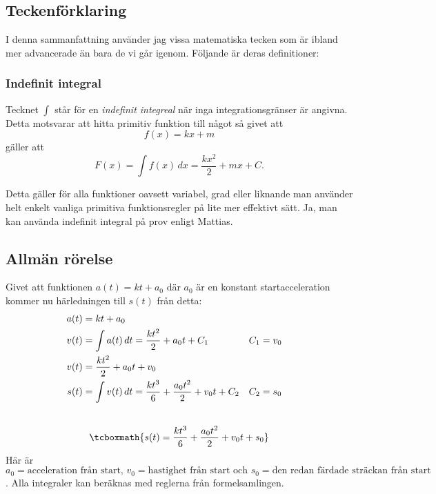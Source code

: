 \subsection{Teckenförklaring}
I denna sammanfattning använder jag vissa matematiska tecken som är ibland mer advancerade än bara de vi går igenom. Följande är deras definitioner:

\subsubsection*{Indefinit integral}
\label{def:indefint}
Tecknet $\int$ står för en \emph{indefinit integreal} när inga integrationsgränser är angivna. Detta motsvarar att hitta primitiv funktion till något så givet att \[f(x) = kx + m\] gäller att
\begin{equation*}
    F(x) = \int{f(x)}\, dx = \frac{kx^2}{2} + mx + C.
\end{equation*}

Detta gäller för alla funktioner oavsett variabel, grad eller liknande man använder helt enkelt vanliga primitiva funktionsregler på lite mer effektivt sätt. Ja, man kan använda indefinit integral på prov enligt Mattias.

\subsection{Allmän rörelse}
\label{derive:allmänrörelse}
Givet att funktionen $a(t) = kt + a_0$ där $a_0$ är en konstant startacceleration kommer nu härledningen till $s(t)$ från detta:
\begin{gather*}
    \begin{aligned}
        \centering
        a(t) &= kt + a_0 \\
        v(t) &= \int{a(t)}\, dt = \frac{kt^2}{2} + a_0t + C_1 & C_1 &= v_0 \\
        v(t) &= \frac{kt^2}{2} + a_0t + v_0 \\
        s(t) &= \int{v(t)}\, dt = \frac{kt^3}{6} + \frac{a_0t^2}{2} + v_0t + C_2 & C_2 &= s_0 \\[10pt]
    \end{aligned} \\[10pt]
    \tcboxmath{s(t) = \frac{kt^3}{6} + \frac{a_0t^2}{2} + v_0t + s_0}
\end{gather*}
\noindent Här är \(a_0 = \text{acceleration från start, } v_0 = \text{hastighet från start och } s_0 = \text{den redan färdade sträckan från start}\). Alla integraler kan beräknas med reglerna från formelsamlingen.
